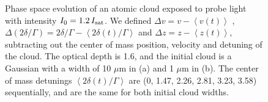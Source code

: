 \documentclass[12pt]{iopart}
\begin{document}
\begin{figure}
\caption{Phase space evolution of an atomic cloud exposed to probe light with intensity $I_0=1.2\, I_{\rm{sat}}$. We defined $\Delta v=v -\left< v(t) \right>$ ,  $\Delta (2\delta/\Gamma)=2\delta/\Gamma -\left< 2\delta(t)/\Gamma \right>$ and $\Delta z=z-\left< z(t) \right>$, subtracting out the center of mass position, velocity and detuning of the cloud. The optical depth is 1.6, and the initial cloud is a Gaussian with a width of 10 $\mu$m in (a) and 1 $\mu$m in (b). The center of mass detunings $\left< 2\delta(t)/\Gamma \right>$ are (0,  1.47,  2.26,  2.81,  3.23, 3.58) sequentially, and are the same for both initial cloud widths. }
\label{fig:phaseSpace}
\end{figure}
\end{document}
